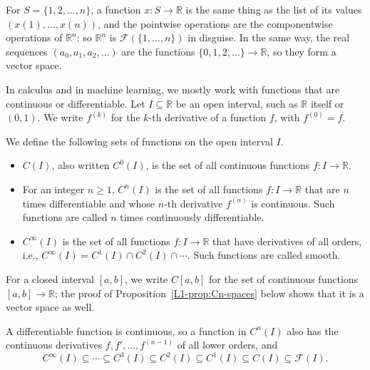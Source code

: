 For $S = \{1, 2, \ldots, n\}$, a function $x: S \to \mathbb{R}$ is the same thing as the list of its values $(x(1), \ldots, x(n))$, and the pointwise operations are the componentwise operations of $\mathbb{R}^n$: so $\mathbb{R}^n$ is $\mathcal{F}(\{1, \ldots, n\})$ in disguise. In the same way, the real sequences $(a_0, a_1, a_2, \ldots)$ are the functions $\{0, 1, 2, \ldots\} \to \mathbb{R}$, so they form a vector space.

In calculus and in machine learning, we mostly work with functions that are continuous or differentiable. Let $I \subseteq \mathbb{R}$ be an open interval, such as $\mathbb{R}$ itself or $(0, 1)$. We write $f^{(k)}$ for the $k$-th derivative of a function $f$, with $f^{(0)} = f$.

\begin{definition}\label{L1-def:Cn}
    We define the following sets of functions on the open interval $I$.
    \begin{itemize}
        \item $C(I)$, also written $C^0(I)$, is the set of all continuous functions $f: I \to \mathbb{R}$.
        \item For an integer $n \geq 1$, $C^n(I)$ is the set of all functions $f: I \to \mathbb{R}$ that are $n$ times differentiable and whose $n$-th derivative $f^{(n)}$ is continuous. Such functions are called $n$ times continuously differentiable.
        \item $C^\infty(I)$ is the set of all functions $f: I \to \mathbb{R}$ that have derivatives of all orders, i.e., $C^\infty(I) = C^1(I) \cap C^2(I) \cap \cdots$. Such functions are called smooth.
    \end{itemize}
    For a closed interval $[a, b]$, we write $C[a, b]$ for the set of continuous functions $[a, b] \to \mathbb{R}$; the proof of Proposition~\ref{L1-prop:Cn-spaces} below shows that it is a vector space as well.
\end{definition}

A differentiable function is continuous, so a function in $C^n(I)$ also has the continuous derivatives $f, f', \ldots, f^{(n-1)}$ of all lower orders, and
\[C^\infty(I) \subseteq \cdots \subseteq C^3(I) \subseteq C^2(I) \subseteq C^1(I) \subseteq C(I) \subseteq \mathcal{F}(I).\]

